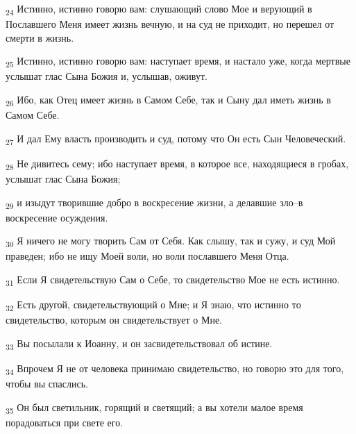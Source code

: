 \begin{tcolorbox}
\textsubscript{24} Истинно, истинно говорю вам: слушающий слово Мое и верующий в Пославшего Меня имеет жизнь вечную, и на суд не приходит, но перешел от смерти в жизнь.
\end{tcolorbox}
\begin{tcolorbox}
\textsubscript{25} Истинно, истинно говорю вам: наступает время, и настало уже, когда мертвые услышат глас Сына Божия и, услышав, оживут.
\end{tcolorbox}
\begin{tcolorbox}
\textsubscript{26} Ибо, как Отец имеет жизнь в Самом Себе, так и Сыну дал иметь жизнь в Самом Себе.
\end{tcolorbox}
\begin{tcolorbox}
\textsubscript{27} И дал Ему власть производить и суд, потому что Он есть Сын Человеческий.
\end{tcolorbox}
\begin{tcolorbox}
\textsubscript{28} Не дивитесь сему; ибо наступает время, в которое все, находящиеся в гробах, услышат глас Сына Божия;
\end{tcolorbox}
\begin{tcolorbox}
\textsubscript{29} и изыдут творившие добро в воскресение жизни, а делавшие зло--в воскресение осуждения.
\end{tcolorbox}
\begin{tcolorbox}
\textsubscript{30} Я ничего не могу творить Сам от Себя. Как слышу, так и сужу, и суд Мой праведен; ибо не ищу Моей воли, но воли пославшего Меня Отца.
\end{tcolorbox}
\begin{tcolorbox}
\textsubscript{31} Если Я свидетельствую Сам о Себе, то свидетельство Мое не есть истинно.
\end{tcolorbox}
\begin{tcolorbox}
\textsubscript{32} Есть другой, свидетельствующий о Мне; и Я знаю, что истинно то свидетельство, которым он свидетельствует о Мне.
\end{tcolorbox}
\begin{tcolorbox}
\textsubscript{33} Вы посылали к Иоанну, и он засвидетельствовал об истине.
\end{tcolorbox}
\begin{tcolorbox}
\textsubscript{34} Впрочем Я не от человека принимаю свидетельство, но говорю это для того, чтобы вы спаслись.
\end{tcolorbox}
\begin{tcolorbox}
\textsubscript{35} Он был светильник, горящий и светящий; а вы хотели малое время порадоваться при свете его.
\end{tcolorbox}
